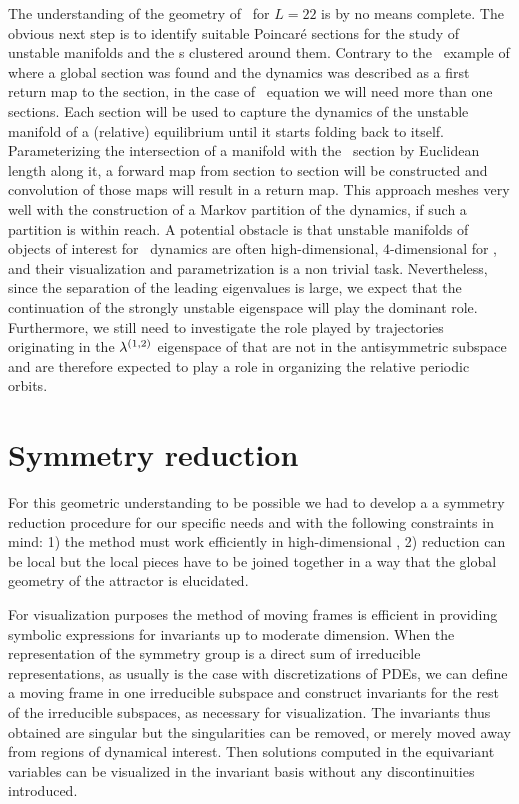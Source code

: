 The understanding of the geometry of \KSe\ for $L=22$ is by
no means complete. The obvious next step is to identify
suitable Poincar\'e sections for the study of unstable
manifolds and the \rpo s clustered around them. Contrary to
the \CLe\ example of  where a global
section was found and the dynamics was described as a first
return map to the section, in the case of \KS\ equation we
will need more than one sections. Each section will be used
to capture the dynamics of the unstable manifold of a
(relative) equilibrium until it starts folding back to
itself. Parameterizing the intersection of a manifold with
the \Poincare\ section by Euclidean length along it, a
forward map from section to section will be constructed and
convolution of those maps will result in a return map. This
approach meshes very well with the construction of a Markov
partition of the dynamics, if such a partition is within
reach. A potential obstacle is that unstable manifolds of
objects of interest for \KS\ dynamics are often
high-dimensional, \eg $4$-dimensional for , and
their visualization and parametrization is a non trivial
task. Nevertheless, since the separation of the leading
eigenvalues is large, we expect that the continuation of the
strongly unstable eigenspace will play the dominant role.
Furthermore, we still need to investigate the role played by
trajectories originating in the $\eigExp[1,2]$ eigenspace of
 that are not in the antisymmetric subspace and are
therefore expected to play a role in organizing the
relative periodic orbits.


\section{Symmetry reduction}

For this geometric understanding to be possible we had to develop a
a symmetry reduction procedure for our specific needs
and with the following
constraints in mind:
1) the method must work efficiently in high-dimensional \statesp, 2) reduction
can be local but the local pieces have to be joined together in
a way that the global geometry of the attractor is elucidated.

For visualization purposes the method of moving frames is efficient in providing
symbolic expressions for invariants up to moderate dimension. When the
representation of the symmetry group is a direct sum of irreducible representations,
as usually is the case with discretizations of PDEs, we can define a moving
frame in one irreducible subspace and construct invariants for the rest of
the irreducible subspaces, as necessary for visualization.
The invariants thus obtained are singular but the singularities can be removed,
or merely moved away from regions of dynamical interest.
Then solutions computed in the equivariant variables can be visualized
in the invariant basis without any discontinuities introduced.

